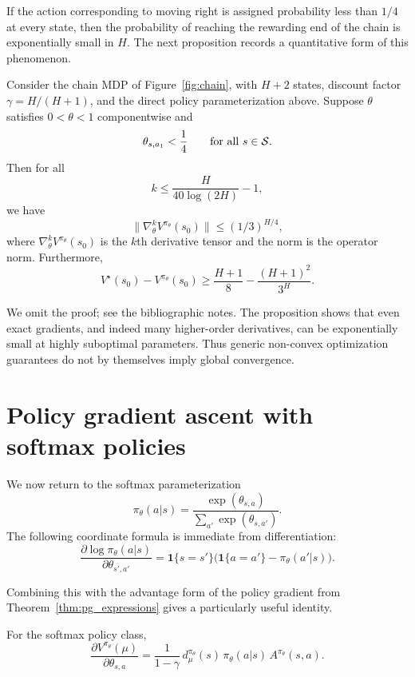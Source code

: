 If the action corresponding to moving right is assigned probability less than $1/4$ at every
state, then the probability of reaching the rewarding end of the chain is exponentially small
in $H$. The next proposition records a quantitative form of this phenomenon.

\begin{proposition}
\label{proposition:small_grad}
Consider the chain MDP of Figure~\ref{fig:chain}, with $H+2$ states, discount factor
$\gamma = H/(H+1)$, and the direct policy parameterization above.
Suppose $\theta$ satisfies $0<\theta<1$ componentwise and
\[
\theta_{s,a_1}<\frac14
\qquad \text{for all } s\in\mathcal{S}.
\]
Then for all
\[
k \le \frac{H}{40\log(2H)}-1,
\]
we have
\[
\|\nabla_\theta^k V^{\pi_\theta}(s_0)\|
\le
(1/3)^{H/4},
\]
where $\nabla_\theta^k V^{\pi_\theta}(s_0)$ is the $k$th derivative tensor and the norm is the
operator norm. Furthermore,
\[
V^\star(s_0)-V^{\pi_\theta}(s_0)
\ge
\frac{H+1}{8} - \frac{(H+1)^2}{3^H}.
\]
\end{proposition}

We omit the proof; see the bibliographic notes. The proposition shows that even exact gradients,
and indeed many higher-order derivatives, can be exponentially small at highly suboptimal parameters.
Thus generic non-convex optimization guarantees do not by themselves imply global convergence.

\section{Policy gradient ascent with softmax policies}

We now return to the softmax parameterization
\[
\pi_\theta(a|s)=\frac{\exp(\theta_{s,a})}{\sum_{a'}\exp(\theta_{s,a'})}.
\]
The following coordinate formula is immediate from differentiation:
\[
\frac{\partial \log \pi_\theta(a|s)}{\partial \theta_{s',a'}}
=
\mathbf{1}\{s=s'\}\Big(\mathbf{1}\{a=a'\}-\pi_\theta(a'|s)\Big).
\]

Combining this with the advantage form of the policy gradient from
Theorem~\ref{thm:pg_expressions} gives a particularly useful identity.

\begin{lemma}\label{eq:softmax-grad}
For the softmax policy class,
\begin{equation}\label{eq:softmax_grad}
\frac{\partial V^{\pi_\theta}(\mu)}{\partial \theta_{s,a}}
=
\frac{1}{1-\gamma}\,
d_\mu^{\pi_\theta}(s)\,\pi_\theta(a|s)\,A^{\pi_\theta}(s,a).
\end{equation}
\end{lemma}

